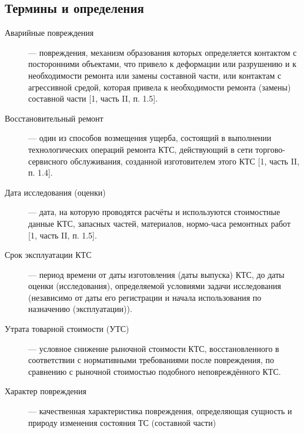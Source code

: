 \subsection{Термины и определения}
\begin{description}
	\item[Аварийные повреждения] --- повреждения, механизм образования которых определяется контактом с посторонними объектами, что привело к деформации или разрушению и к необходимости ремонта или замены составной части, или контактам с агрессивной средой, которая привела к необходимости ремонта (замены) составной части [1, часть II, п. 1.5].
	\item[Восстановительный ремонт]--- один из способов возмещения ущерба, состоящий в выполнении технологических операций ремонта КТС, действующий в сети торгово-сервисного обслуживания, созданной изготовителем этого КТС [1, часть II, п. 1.4].
	\item[Дата исследования (оценки)]--- дата, на которую проводятся расчёты и используются стоимостные данные КТС, запасных частей, материалов, нормо-часа ремонтных работ [1, часть II, п. 1.5].
	\item[Срок эксплуатации КТС]--- период времени от даты изготовления (даты выпуска) КТС, до даты оценки (исследования), определяемой условиями задачи исследования (независимо от даты его регистрации и начала использования по назначению (эксплуатации)).
	\item[Утрата товарной стоимости (УТС)]--- условное снижение рыночной стоимости КТС, восстановленного в соответствии с нормативными требованиями после повреждения, по сравнению с рыночной стоимостью подобного неповреждённого КТС. 
	\item[Характер повреждения]--- качественная характеристика повреждения, определяющая сущность и природу изменения состояния ТС (составной части)

\end{description}

